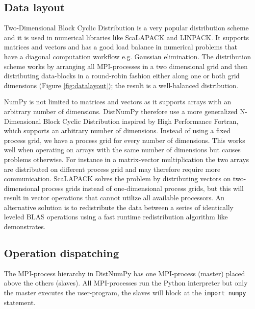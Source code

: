\documentclass[10pt]{article}
\begin{document}
\subsection{Data layout}
Two-Dimensional Block Cyclic Distribution is a very popular distribution scheme and it is used in numerical libraries like ScaLAPACK\cite{Blackford96} and LINPACK\cite{linpack79}. It supports matrices and vectors and has a good load balance in numerical problems that have a diagonal computation workflow e.g. Gaussian elimination. The distribution scheme works by arranging all MPI-processes in a two dimensional grid and then distributing data-blocks in a round-robin fashion either along one or both grid dimensions (Figure \ref {fig:datalayout}); the result is a well-balanced distribution.

NumPy is not limited to matrices and vectors as it supports arrays with an arbitrary number of dimensions. DistNumPy therefore use a more generalized N-Dimensional Block Cyclic Distribution inspired by High Performance Fortran\cite{Loveman93}, which supports an arbitrary number of dimensions. Instead of using a fixed process grid, we have a process grid for every number of dimensions. This works well when operating on arrays with the same number of dimensions but causes problems otherwise. For instance in a matrix-vector multiplication the two arrays are distributed on different process grid and may therefore require more communication. ScaLAPACK solves the problem by distributing vectors on two-dimensional process grids instead of one-dimensional process grids, but this will result in vector operations that cannot utilize all available processors. An alternative solution is to redistribute the data between a series of identically leveled BLAS operations using a fast runtime redistribution algorithm like \cite{PrylliT97} demonstrates.


\subsection{Operation dispatching}
The MPI-process hierarchy in DistNumPy has one MPI-process (master) placed above the others (slaves). All MPI-processes run the Python interpreter but only the master executes the user-program, the slaves will block at the \texttt{import numpy} statement. 
\end{document}
